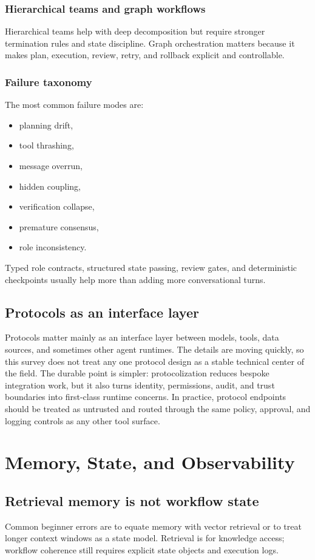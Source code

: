 \documentclass[11pt]{article}
\begin{document}
\subsubsection{Hierarchical teams and graph workflows}
Hierarchical teams help with deep decomposition but require stronger termination rules and state discipline. Graph orchestration matters because it makes plan, execution, review, retry, and rollback explicit and controllable.

\subsubsection{Failure taxonomy}
The most common failure modes are:
\begin{itemize}[leftmargin=1.2em]
  \item planning drift,
  \item tool thrashing,
  \item message overrun,
  \item hidden coupling,
  \item verification collapse,
  \item premature consensus,
  \item role inconsistency.
\end{itemize}
Typed role contracts, structured state passing, review gates, and deterministic checkpoints usually help more than adding more conversational turns.

\subsection{Protocols as an interface layer}
Protocols matter mainly as an interface layer between models, tools, data sources, and sometimes other agent runtimes. The details are moving quickly, so this survey does not treat any one protocol design as a stable technical center of the field. The durable point is simpler: protocolization reduces bespoke integration work, but it also turns identity, permissions, audit, and trust boundaries into first-class runtime concerns. In practice, protocol endpoints should be treated as untrusted and routed through the same policy, approval, and logging controls as any other tool surface.

\section{Memory, State, and Observability}
\subsection{Retrieval memory is not workflow state}
Common beginner errors are to equate memory with vector retrieval or to treat longer context windows as a state model. Retrieval is for knowledge access; workflow coherence still requires explicit state objects and execution logs.
\end{document}
